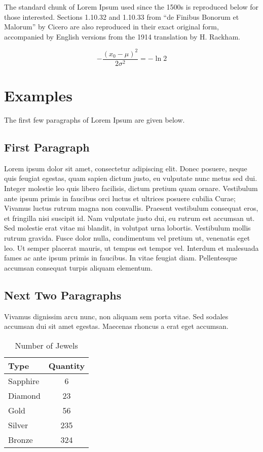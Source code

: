 The standard chunk of Lorem Ipsum used since the 1500s is reproduced below for those interested. Sections 1.10.32 and 1.10.33 from ``de Finibus Bonorum et Malorum'' by Cicero are also reproduced in their exact original form, accompanied by English versions from the 1914 translation by H. Rackham. 

\begin{equation}
-\frac{(x_0 - \mu)^2}{2 \sigma^2} = -\ln 2
\end{equation}


\section{Examples}
\label{sec:examples}

The first few paragraphs of Lorem Ipsum are given below.

\subsection{First Paragraph}

Lorem ipsum dolor sit amet, consectetur adipiscing elit. Donec posuere, neque quis feugiat egestas, quam sapien dictum justo, eu vulputate nunc metus sed dui. Integer molestie leo quis libero facilisis, dictum pretium quam ornare. Vestibulum ante ipsum primis in faucibus orci luctus et ultrices posuere cubilia Curae; Vivamus luctus rutrum magna non convallis. Praesent vestibulum consequat eros, et fringilla nisi suscipit id. Nam vulputate justo dui, eu rutrum est accumsan ut. Sed molestie erat vitae mi blandit, in volutpat urna lobortis. Vestibulum mollis rutrum gravida. Fusce dolor nulla, condimentum vel pretium ut, venenatis eget leo. Ut semper placerat mauris, ut tempus est tempor vel. Interdum et malesuada fames ac ante ipsum primis in faucibus. In vitae feugiat diam. Pellentesque accumsan consequat turpis aliquam elementum.


\subsection{Next Two Paragraphs}

Vivamus dignissim arcu nunc, non aliquam sem porta vitae. Sed sodales accumsan dui sit amet egestas. Maecenas rhoncus a erat eget accumsan. 

\begin{table}[hbt!]\centering
\caption{Number of Jewels}

\begin{tabular}{l c}
\hline
Type & Quantity \\\hline
Sapphire & 6\\
Diamond & 23\\
Gold & 56\\
Silver & 235\\
Bronze & 324\\\hline
\end{tabular}
\end{table}


